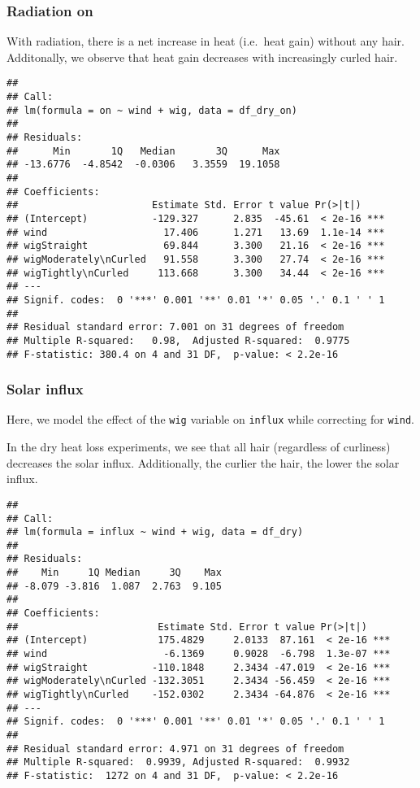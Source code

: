 \documentclass[
]{article}
\begin{document}
\hypertarget{radiation-on}{%
\subsubsection{Radiation on}\label{radiation-on}}

With radiation, there is a net increase in heat (i.e.~heat gain) without
any hair. Additonally, we observe that heat gain decreases with
increasingly curled hair.

\begin{verbatim}
## 
## Call:
## lm(formula = on ~ wind + wig, data = df_dry_on)
## 
## Residuals:
##      Min       1Q   Median       3Q      Max 
## -13.6776  -4.8542  -0.0306   3.3559  19.1058 
## 
## Coefficients:
##                       Estimate Std. Error t value Pr(>|t|)    
## (Intercept)           -129.327      2.835  -45.61  < 2e-16 ***
## wind                    17.406      1.271   13.69  1.1e-14 ***
## wigStraight             69.844      3.300   21.16  < 2e-16 ***
## wigModerately\nCurled   91.558      3.300   27.74  < 2e-16 ***
## wigTightly\nCurled     113.668      3.300   34.44  < 2e-16 ***
## ---
## Signif. codes:  0 '***' 0.001 '**' 0.01 '*' 0.05 '.' 0.1 ' ' 1
## 
## Residual standard error: 7.001 on 31 degrees of freedom
## Multiple R-squared:   0.98,  Adjusted R-squared:  0.9775 
## F-statistic: 380.4 on 4 and 31 DF,  p-value: < 2.2e-16
\end{verbatim}

\hypertarget{solar-influx}{%
\subsubsection{Solar influx}\label{solar-influx}}

Here, we model the effect of the \texttt{wig} variable on
\texttt{influx} while correcting for \texttt{wind}.

In the dry heat loss experiments, we see that all hair (regardless of
curliness) decreases the solar influx. Additionally, the curlier the
hair, the lower the solar influx.

\begin{verbatim}
## 
## Call:
## lm(formula = influx ~ wind + wig, data = df_dry)
## 
## Residuals:
##    Min     1Q Median     3Q    Max 
## -8.079 -3.816  1.087  2.763  9.105 
## 
## Coefficients:
##                        Estimate Std. Error t value Pr(>|t|)    
## (Intercept)            175.4829     2.0133  87.161  < 2e-16 ***
## wind                    -6.1369     0.9028  -6.798  1.3e-07 ***
## wigStraight           -110.1848     2.3434 -47.019  < 2e-16 ***
## wigModerately\nCurled -132.3051     2.3434 -56.459  < 2e-16 ***
## wigTightly\nCurled    -152.0302     2.3434 -64.876  < 2e-16 ***
## ---
## Signif. codes:  0 '***' 0.001 '**' 0.01 '*' 0.05 '.' 0.1 ' ' 1
## 
## Residual standard error: 4.971 on 31 degrees of freedom
## Multiple R-squared:  0.9939, Adjusted R-squared:  0.9932 
## F-statistic:  1272 on 4 and 31 DF,  p-value: < 2.2e-16
\end{verbatim}
\end{document}

